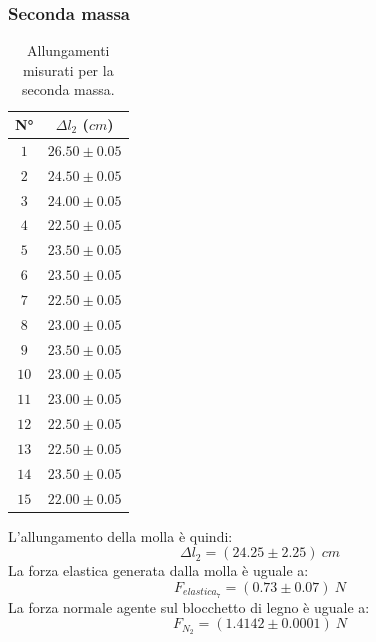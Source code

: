 \documentclass[11pt]{article}
\begin{document}
\subsubsection{Seconda massa}
\begin{table}[H]
\centering
\begin{tabular}{|c|c|}
\hline
\textbf{N°} & \textbf{$\Delta l_2$ ($cm$)}\\
\hline
$1$ & $26.50\pm 0.05$ \\
\hline
$2$ & $24.50\pm 0.05$ \\
\hline
$3$ & $24.00\pm 0.05$ \\
\hline
$4$ & $22.50\pm 0.05$ \\
\hline
$5$ & $23.50\pm 0.05$ \\
\hline
$6$ & $23.50\pm 0.05$ \\
\hline
$7$ & $22.50\pm 0.05$ \\
\hline
$8$ & $23.00\pm 0.05$ \\
\hline
$9$ & $23.50\pm 0.05$ \\
\hline
$10$ & $23.00\pm 0.05$ \\
\hline
$11$ & $23.00\pm 0.05$ \\
\hline
$12$ & $22.50\pm 0.05$ \\
\hline
$13$ & $22.50\pm 0.05$ \\
\hline
$14$ & $23.50\pm 0.05$ \\
\hline
$15$ & $22.00\pm 0.05$ \\
\hline
\end{tabular}
\caption{Allungamenti misurati per la seconda massa.}
\label{tab:}
\end{table}
L'allungamento della molla è quindi:
\begin{equation}
    \Delta l_2=(24.25\pm 2.25)\ cm
\end{equation}
La forza elastica generata dalla molla è uguale a:
\begin{equation}
    F_{elastica_7} = (0.73\pm 0.07)\ N
\end{equation}
La forza normale agente sul blocchetto di legno è uguale a:
\begin{equation}
    F_{N_2} = (1.4142\pm 0.0001)\ N
\end{equation}
\end{document}
